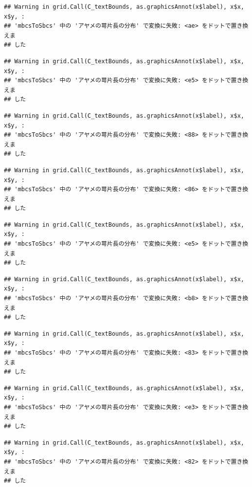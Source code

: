 \documentclass[
]{book}
\begin{document}
\begin{verbatim}
## Warning in grid.Call(C_textBounds, as.graphicsAnnot(x$label), x$x, x$y, :
## 'mbcsToSbcs' 中の 'アヤメの萼片長の分布' で変換に失敗: <ae> をドットで置き換えま
## した
\end{verbatim}

\begin{verbatim}
## Warning in grid.Call(C_textBounds, as.graphicsAnnot(x$label), x$x, x$y, :
## 'mbcsToSbcs' 中の 'アヤメの萼片長の分布' で変換に失敗: <e5> をドットで置き換えま
## した
\end{verbatim}

\begin{verbatim}
## Warning in grid.Call(C_textBounds, as.graphicsAnnot(x$label), x$x, x$y, :
## 'mbcsToSbcs' 中の 'アヤメの萼片長の分布' で変換に失敗: <88> をドットで置き換えま
## した
\end{verbatim}

\begin{verbatim}
## Warning in grid.Call(C_textBounds, as.graphicsAnnot(x$label), x$x, x$y, :
## 'mbcsToSbcs' 中の 'アヤメの萼片長の分布' で変換に失敗: <86> をドットで置き換えま
## した
\end{verbatim}

\begin{verbatim}
## Warning in grid.Call(C_textBounds, as.graphicsAnnot(x$label), x$x, x$y, :
## 'mbcsToSbcs' 中の 'アヤメの萼片長の分布' で変換に失敗: <e5> をドットで置き換えま
## した
\end{verbatim}

\begin{verbatim}
## Warning in grid.Call(C_textBounds, as.graphicsAnnot(x$label), x$x, x$y, :
## 'mbcsToSbcs' 中の 'アヤメの萼片長の分布' で変換に失敗: <b8> をドットで置き換えま
## した
\end{verbatim}

\begin{verbatim}
## Warning in grid.Call(C_textBounds, as.graphicsAnnot(x$label), x$x, x$y, :
## 'mbcsToSbcs' 中の 'アヤメの萼片長の分布' で変換に失敗: <83> をドットで置き換えま
## した
\end{verbatim}

\begin{verbatim}
## Warning in grid.Call(C_textBounds, as.graphicsAnnot(x$label), x$x, x$y, :
## 'mbcsToSbcs' 中の 'アヤメの萼片長の分布' で変換に失敗: <e3> をドットで置き換えま
## した
\end{verbatim}

\begin{verbatim}
## Warning in grid.Call(C_textBounds, as.graphicsAnnot(x$label), x$x, x$y, :
## 'mbcsToSbcs' 中の 'アヤメの萼片長の分布' で変換に失敗: <82> をドットで置き換えま
## した
\end{verbatim}
\end{document}
